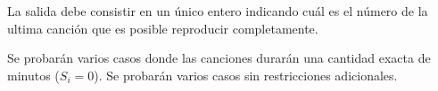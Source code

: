 \documentclass{oci}
\begin{document}
\begin{outputDescription}
  La salida debe consistir en un único entero indicando cuál es el número 
de la ultima canción que es posible reproducir completamente.
\end{outputDescription}

\begin{scoreDescription}
   Se probarán varios casos donde las canciones durarán una cantidad
  exacta de minutos ($S_i = 0$).
   Se probarán varios casos sin restricciones adicionales. 
\end{scoreDescription}

\begin{sampleDescription}
\end{sampleDescription}
\end{document}
